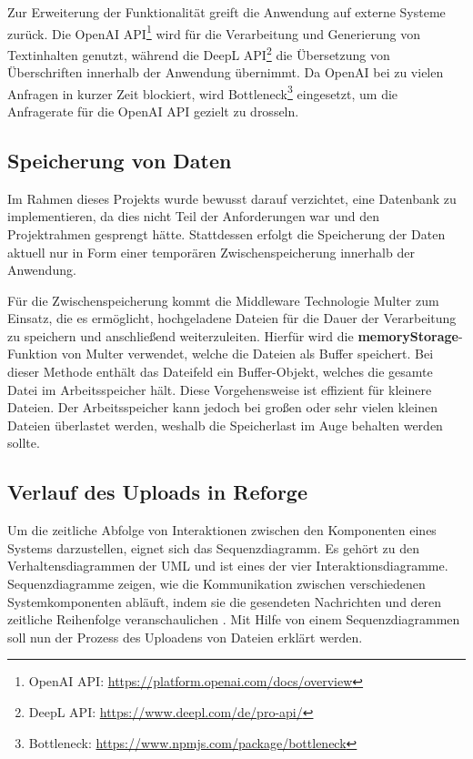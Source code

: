 Zur Erweiterung der Funktionalität greift die Anwendung auf externe Systeme zurück. Die OpenAI \ac{API}\footnote[4]{OpenAI API: \href{https://platform.openai.com/docs/overview}{https://platform.openai.com/docs/overview}} wird für die Verarbeitung und Generierung von Textinhalten genutzt, während die DeepL \ac{API}\footnote[5]{DeepL API: \href{https://www.deepl.com/de/pro-api/}{https://www.deepl.com/de/pro-api/}} die Übersetzung von Überschriften innerhalb der Anwendung übernimmt. Da OpenAI bei zu vielen Anfragen in kurzer Zeit blockiert, wird Bottleneck\footnote[6]{Bottleneck: \href{https://www.npmjs.com/package/bottleneck}{https://www.npmjs.com/package/bottleneck}} eingesetzt, um die Anfragerate für die OpenAI \ac{API} gezielt zu drosseln.

\subsection{Speicherung von Daten}
Im Rahmen dieses Projekts wurde bewusst darauf verzichtet, eine Datenbank zu implementieren, da dies nicht Teil der Anforderungen war und den Projektrahmen gesprengt hätte. Stattdessen erfolgt die Speicherung der Daten aktuell nur in Form einer temporären Zwischenspeicherung innerhalb der Anwendung.

Für die Zwischenspeicherung kommt die Middleware Technologie Multer zum Einsatz, die es ermöglicht, hochgeladene Dateien für die Dauer der Verarbeitung zu speichern und anschließend weiterzuleiten. Hierfür wird die \textbf{memoryStorage}-Funktion von Multer verwendet, welche die Dateien als Buffer speichert. Bei dieser Methode enthält das Dateifeld ein Buffer-Objekt, welches die gesamte Datei im Arbeitsspeicher hält. Diese Vorgehensweise ist effizient für kleinere Dateien. Der Arbeitsspeicher kann jedoch bei großen oder sehr vielen kleinen Dateien überlastet werden, weshalb die Speicherlast im Auge behalten werden sollte. \cite{multer}

\subsection{Verlauf des Uploads in Reforge}

Um die zeitliche Abfolge von Interaktionen zwischen den Komponenten eines Systems darzustellen, eignet sich das Sequenzdiagramm. Es gehört zu den Verhaltensdiagrammen der \ac{UML} und ist eines der vier Interaktionsdiagramme. Sequenzdiagramme zeigen, wie die Kommunikation zwischen verschiedenen Systemkomponenten abläuft, indem sie die gesendeten Nachrichten und deren zeitliche Reihenfolge veranschaulichen \cite{rumpe2004sequenzdiagramme}. Mit Hilfe von einem Sequenzdiagrammen soll nun der Prozess des Uploadens von Dateien erklärt werden.

